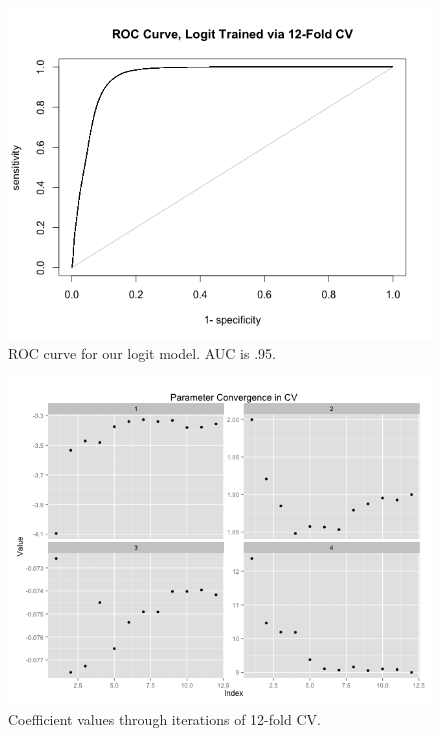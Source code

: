 \documentclass{article}\usepackage[]{graphicx}\usepackage[]{color}
\begin{document}
\begin{figure}[H]
\begin{center}
\includegraphics[scale = .5]{LogitROC.png}
\caption{ROC curve for our logit model. AUC is .95.}
\end{center}
\end{figure}

\begin{figure}[H]
\begin{center}
\includegraphics[scale = .5]{ParameterConvergence.png}
\caption{Coefficient values through iterations of 12-fold CV.}
\end{center}
\end{figure}
\end{document}
